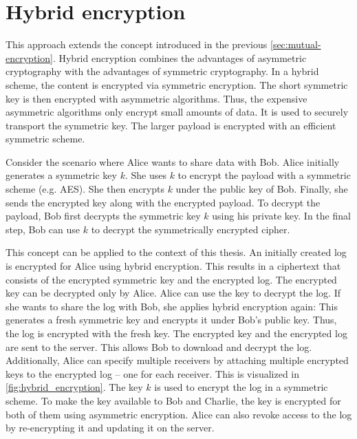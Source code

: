 \documentclass[../main.tex]{subfiles}
\begin{document}
\section{Hybrid encryption}
\label{sec:hybrid-encryption}

This approach extends the concept introduced in the previous \cref{sec:mutual-encryption}.
Hybrid encryption combines the advantages of asymmetric cryptography with the advantages of symmetric cryptography.
In a hybrid scheme, the content is encrypted via symmetric encryption.
The short symmetric key is then encrypted with asymmetric algorithms.
Thus, the expensive asymmetric algorithms only encrypt small amounts of data.
It is used to securely transport the symmetric key.
The larger payload is encrypted with an efficient symmetric scheme.
~\cite[340]{Eckert2018}

Consider the scenario where Alice wants to share data with Bob.
Alice initially generates a symmetric key $k$.
She uses $k$ to encrypt the payload with a symmetric scheme (e.g. AES).
She then encrypts $k$ under the public key of Bob.
Finally, she sends the encrypted key along with the encrypted payload.
To decrypt the payload, Bob first decrypts the symmetric key $k$ using his private key.
In the final step, Bob can use $k$ to decrypt the symmetrically encrypted cipher.

This concept can be applied to the context of this thesis.
An initially created log is encrypted for Alice using hybrid encryption.
This results in a ciphertext that consists of the encrypted symmetric key and the encrypted log.
The encrypted key can be decrypted only by Alice.
Alice can use the key to decrypt the log.
If she wants to share the log with Bob, she applies hybrid encryption again:
This generates a fresh symmetric key and encrypts it under Bob's public key.
Thus, the log is encrypted with the fresh key.
The encrypted key and the encrypted log are sent to the server.
This allows Bob to download and decrypt the log.
Additionally, Alice can specify multiple receivers by attaching multiple encrypted keys to the encrypted log -- one for each receiver.
This is visualized in \cref{fig:hybrid_encryption}. 
The key $k$ is used to encrypt the log in a symmetric scheme.
To make the key available to Bob and Charlie, the key is encrypted for both of them using asymmetric encryption.
Alice can also revoke access to the log by re-encrypting it and updating it on the server. 
\end{document}
